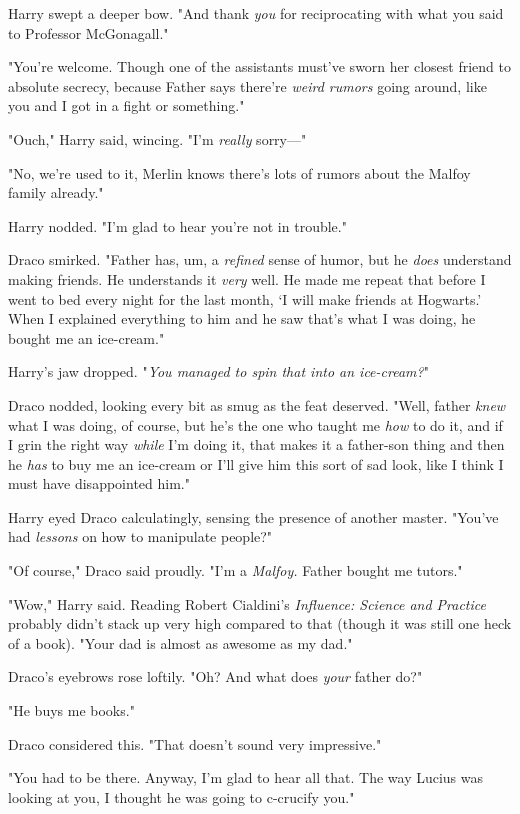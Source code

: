 Harry swept a deeper bow. "And thank \emph{you} for reciprocating with what you
said to Professor McGonagall."

"You're welcome. Though one of the assistants must've sworn her closest friend
to absolute secrecy, because Father says there're \emph{weird rumors} going
around, like you and I got in a fight or something."

"Ouch," Harry said, wincing. "I'm \emph{really} sorry---"

"No, we're used to it, Merlin knows there's lots of rumors about the Malfoy
family already."

Harry nodded. "I'm glad to hear you're not in trouble."

Draco smirked. "Father has, um, a \emph{refined} sense of humor, but he
\emph{does} understand making friends. He understands it \emph{very} well. He
made me repeat that before I went to bed every night for the last month, `I
will make friends at Hogwarts.' When I explained everything to him and he saw
that's what I was doing, he bought me an ice-cream."

Harry's jaw dropped. "\emph{You managed to spin that into an ice-cream?}"

Draco nodded, looking every bit as smug as the feat deserved. "Well, father
\emph{knew} what I was doing, of course, but he's the one who taught me
\emph{how} to do it, and if I grin the right way \emph{while} I'm doing it,
that makes it a father-son thing and then he \emph{has} to buy me an ice-cream
or I'll give him this sort of sad look, like I think I must have disappointed
him."

Harry eyed Draco calculatingly, sensing the presence of another master. "You've
had \emph{lessons} on how to manipulate people?"

"Of course," Draco said proudly. "I'm a \emph{Malfoy.} Father bought me tutors."

"Wow," Harry said. Reading Robert Cialdini's \emph{Influence: Science and
Practice} probably didn't stack up very high compared to that (though it was
still one heck of a book). "Your dad is almost as awesome as my dad."

Draco's eyebrows rose loftily. "Oh? And what does \emph{your} father do?"

"He buys me books."

Draco considered this. "That doesn't sound very impressive."

"You had to be there. Anyway, I'm glad to hear all that. The way Lucius was
looking at you, I thought he was going to c-crucify you."

